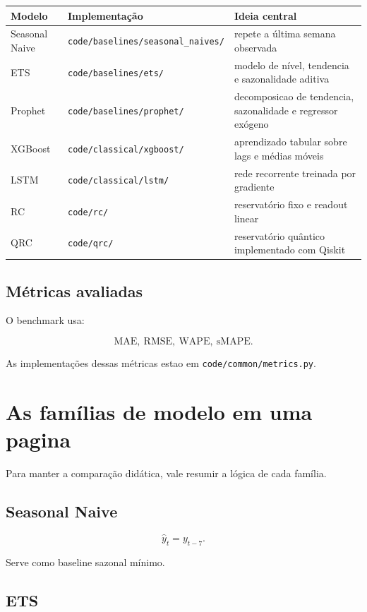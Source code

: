 \documentclass[12pt]{article}
\begin{document}
\begin{longtable}[]{@{}lll@{}}
\toprule\noalign{}
Modelo & Implementação & Ideia central \\
\midrule\noalign{}
\endhead
\bottomrule\noalign{}
\endlastfoot
Seasonal Naive & \texttt{code/baselines/seasonal\_naives/} & repete a última semana observada \\
ETS & \texttt{code/baselines/ets/} & modelo de nível, tendencia e sazonalidade aditiva \\
Prophet & \texttt{code/baselines/prophet/} & decomposicao de tendencia, sazonalidade e regressor exógeno \\
XGBoost & \texttt{code/classical/xgboost/} & aprendizado tabular sobre lags e médias móveis \\
LSTM & \texttt{code/classical/lstm/} & rede recorrente treinada por gradiente \\
RC & \texttt{code/rc/} & reservatório fixo e readout linear \\
QRC & \texttt{code/qrc/} & reservatório quântico implementado com Qiskit \\
\end{longtable}

\subsection{Métricas avaliadas}\label{34-muxe9tricas-avaliadas}

O benchmark usa:

\[
\mathrm{MAE},\ \mathrm{RMSE},\ \mathrm{WAPE},\ \mathrm{sMAPE}.
\]

As implementações dessas métricas estao em \texttt{code/common/metrics.py}.

\section{As famílias de modelo em uma pagina}\label{4-as-famuxedlias-de-modelo-em-uma-pagina}

Para manter a comparação didática, vale resumir a lógica de cada família.

\subsection{Seasonal Naive}\label{41-seasonal-naive}

\[
\hat{y}_t = y_{t-7}.
\]

Serve como baseline sazonal mínimo.

\subsection{ETS}\label{42-ets}
\end{document}
